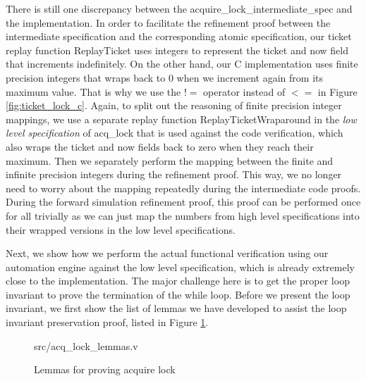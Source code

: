 There is still one discrepancy between the \textsf{acquire\_lock\_intermediate\_spec} and the
implementation. In order to facilitate the refinement proof between the intermediate specification
and the corresponding atomic specification, our ticket replay function \textsf{ReplayTicket}
uses integers to represent the \textsf{ticket} and \textsf{now} field that increments indefinitely.
On the other hand, our C implementation uses finite precision integers that wraps back to 0 when
we increment again from its maximum value. That is why we use the $!=$ operator instead
of $<=$ in Figure \ref{fig:ticket_lock_c}.
Again, to split out the reasoning of finite precision integer mappings, we use a separate
replay function \textsf{ReplayTicketWraparound} in the \textit{low level specification} of
\textsf{acq\_lock} that is used against the code verification, which also wraps the \textsf{ticket}
and \textsf{now} fields back to zero when they reach their maximum.
Then we separately perform the mapping between
the finite and infinite precision integers during the refinement proof. This way, we no longer
need to worry about the mapping repeatedly during the intermediate code proofs. During
the forward simulation refinement proof, this proof can be performed once for all trivially as
we can just map the numbers from high level specifications into their wrapped versions
in the low level specifications.

Next, we show how we perform the actual functional verification using our automation engine
against the low level specification, which is already extremely close to the implementation.
The major challenge here is to get the proper loop invariant to prove the termination of the while
loop. Before we present the loop invariant, we first show the list of lemmas we have developed
to assist the loop invariant preservation proof, listed in Figure \ref{fig:acq_lock_lemmas_v}.

\begin{figure}
	 {src/acq_lock_lemmas.v}
	\caption{Lemmas for proving acquire lock}
	\label{fig:acq_lock_lemmas_v}
\end{figure}

